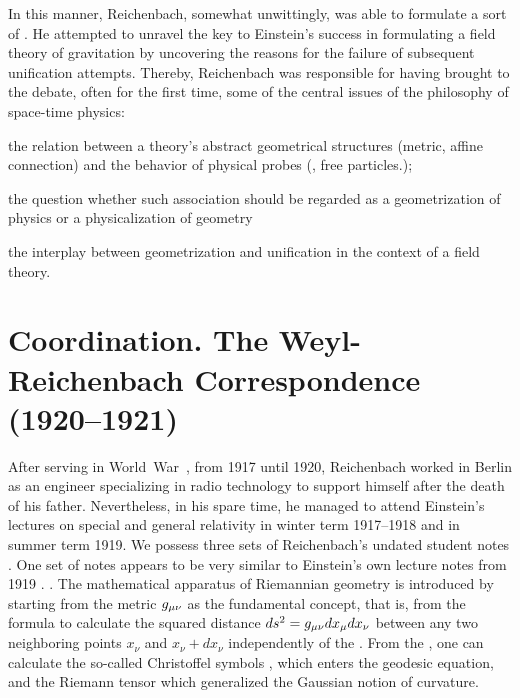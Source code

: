 \documentclass[final]{article}
\newcommand{\xdx}{\ensuremath{x_\nu} and \ensuremath{x_\nu + dx_\nu}\xspace}
\begin{document}

In this manner, Reichenbach, somewhat unwittingly, was able to formulate a sort of  \citep{Lehmkuhl2017}. He attempted to unravel the key to Einstein's success in formulating a field theory of gravitation by uncovering the reasons for the failure of subsequent unification attempts. Thereby, Reichenbach was responsible for having brought to the debate, often for the first time, some of the central issues of the philosophy of space-time physics: \begin{inparaenum}[(a)] \item the relation between a theory's abstract geometrical structures (metric, affine connection) and the behavior of physical probes (\rac, free particles\etc.); \item the question whether such association should be regarded as a geometrization of physics or a physicalization of geometry \item the interplay between geometrization and unification in the context of a field theory. \end{inparaenum} 

\section{Coordination. The Weyl-Reichenbach Correspondence (1920--1921)}
\label{Coordination}

After serving in World~War~, from 1917 until 1920, Reichenbach worked in Berlin as an engineer specializing in radio technology to support himself after the death of his father. Nevertheless, in his spare time, he managed to attend Einstein's lectures on special and general relativity in winter term 1917--1918 and in summer term 1919. We possess three sets of Reichenbach's undated student notes \citep[028-01-04, 028-01-03, 028-01-01]{HR}. One set of notes \citep[028-01-01]{HR} appears to be very similar to Einstein's own lecture notes from 1919 \citep{Einstein1919c}. . The mathematical apparatus of Riemannian geometry is introduced by starting from the metric $g_{\mu\nu}$ as the fundamental concept, that is, from the formula to calculate the squared distance $ds^2=g_{\mu\nu} dx_\mu dx_\nu$ between any two neighboring points \xdx independently of the \cs. From the \gmn, one can calculate the so-called Christoffel symbols \christoffel{\mu}{\nu}{\tau}, which enters the geodesic equation, and the Riemann tensor \rite which generalized the Gaussian notion of curvature. 
\end{document}
